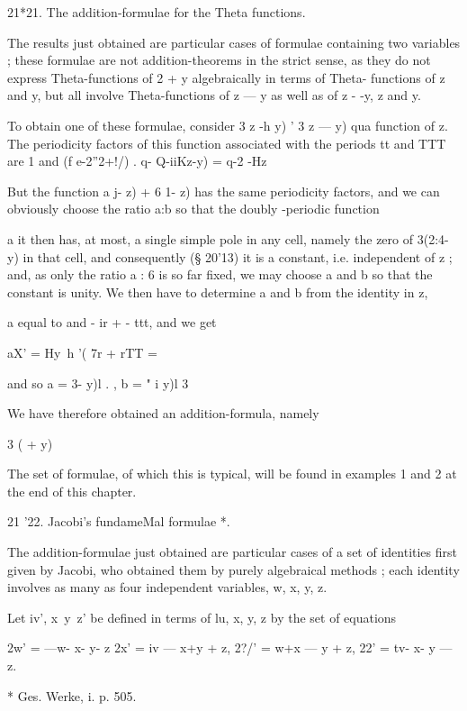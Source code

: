 21*21. The addition-formulae for the Theta functions.

The results just obtained are particular cases of formulae containing
two variables ; these formulae are not addition-theorems in the strict
sense, as they do not express Theta-functions of 2 + y algebraically
in terms of Theta- functions of z and y, but all involve
Theta-functions of z — y as well as of z - -y, z and y.

To obtain one of these formulae, consider 3 z -h y) ' 3 z — y) qua
function of z. The periodicity factors of this function associated
with the periods tt and TTT are 1 and (f e-2''2+!/) . q- Q-iiKz-y) =
q-2 -Hz

But the function a j- z) + 6 1- z) has the same periodicity factors,
and we can obviously choose the ratio a:b so that the doubly -periodic
function

a%
it then has, at most, a single simple pole in any cell, namely the
zero of 3(2:4- y) in that cell, and consequently (§ 20'13) it is a
constant, i.e. independent of z ; and, as only the ratio a : 6 is so
far fixed, we may choose a and b so that the constant is unity. We
then have to determine a and b from the identity in z,

a%
equal to and - ir + - ttt, and we get

aX' = Hy\ h '( 7r + rTT = %

and so a = 3- y)l . , b = " i y)l 3\

We have therefore obtained an addition-formula, namely

 3 ( + y) %

The set of formulae, of which this is typical, will be found in
examples 1 and 2 at the end of this chapter.

21 '22. Jacobi's fundameMal formulae *.

The addition-formulae just obtained are particular cases of a set of
identities first given by Jacobi, who obtained them by purely
algebraical methods ; each identity involves as many as four
independent variables, w, x, y, z.

Let iv', x\ y\ z' be defined in terms of lu, x, y, z by the set of
equations

2w' = —w- x- y- z 2x' = iv — x+y + z, 2?/' = w+x — y + z, 22' = tv- x-
y — z.

* Ges. Werke, i. p. 505.

